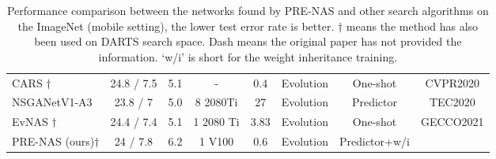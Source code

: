 \documentclass[sigconf]{acmart}
\begin{document}
\begin{table*}[!th]
\begin{tabular}{l|c|c|c|c|c|c|c}
CARS \cite{Ref:07}$\dagger$                  & 24.8 / 7.5                                                                                       & 5.1                                                           & -                                & 0.4                                                                       & Evolution                                  & One-shot  &CVPR2020                                     \\
NSGANetV1-A3 \cite{Ref:61}                   & 23.8 / 7                                                                                   & 5.0                                                           & 8 2080Ti                          & 27                                                                      & Evolution                                  & Predictor         &TEC2020                          \\
EvNAS \cite{Ref:62}$\dagger$              & 24.4 / 7.4                                                                                     & 5.1                                                           & 1 2080 Ti                                & 3.83                                                                       & Evolution                                  & One-shot       &GECCO2021 \\\hline

PRE-NAS (ours)$\dagger$                    & 24 / 7.8                                                                                       & 6.2                                                           & 1 V100                             & 0.6                                                                         & Evolution                                  & Predictor+w/i                                      \\ \hline
\end{tabular}
\caption{Performance comparison between the networks found by PRE-NAS and other search algorithms on the ImageNet (mobile setting), the lower test error rate is better.  $\dagger$ means the method has also been used on DARTS search space. Dash means the original paper has not provided the information. `w/i' is short for the weight inheritance training.}
\label{imagenetresults}
\end{table*}
\end{document}

